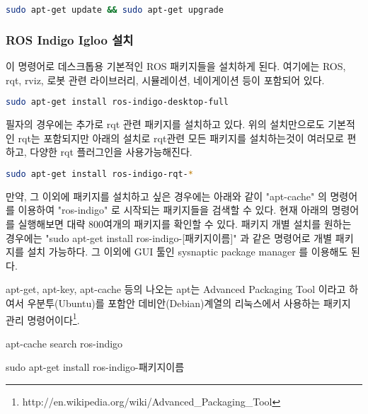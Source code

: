 \begin{lstlisting}[language=bash]
sudo apt-get update && sudo apt-get upgrade
\end{lstlisting}

\subsubsection{ROS Indigo Igloo 설치}
이 명령어로 데스크톱용 기본적인 ROS 패키지들을 설치하게 된다. 여기에는 ROS, rqt, rviz, 로봇 관련 라이브러리, 시뮬레이션, 네이게이션 등이 포함되어 있다.

\begin{lstlisting}[language=bash]
sudo apt-get install ros-indigo-desktop-full
\end{lstlisting}

필자의 경우에는 추가로 rqt 관련 패키지를 설치하고 있다. 위의 설치만으로도 기본적인 rqt는 포함되지만 아래의 설치로 rqt관련 모든 패키지를 설치하는것이 여러모로 편하고, 다양한 rqt 플러그인을 사용가능해진다.

\begin{lstlisting}[language=bash]
sudo apt-get install ros-indigo-rqt-*
\end{lstlisting}

만약, 그 이외에 패키지를 설치하고 싶은 경우에는 아래와 같이  "apt-cache" 의 명령어를 이용하여 "ros-indigo" 로 시작되는 패키지들을 검색할 수 있다. 현재 아래의 명령어를 실행해보면 대략 800여개의 패키지를 확인할 수 있다. 패키지 개별 설치를 원하는 경우에는 "sudo apt-get install ros-indigo-[패키지이름]" 과 같은 명령어로 개별 패키지를 설치 가능하다. 그 이외에 GUI 툴인 sysnaptic package manager 를 이용해도 된다.

\begin{exercise}
apt-get, apt-key, apt-cache 등의 나오는 apt는 Advanced Packaging Tool 이라고 하여서 우분투(Ubuntu)를 포함안 데비안(Debian)계열의 리눅스에서 사용하는 패키지 관리 명령어이다\footnote{http://en.wikipedia.org/wiki/Advanced\_Packaging\_Tool}.
\end{exercise}

\begin{exercise}[패키지 검색 방법]
apt-cache search ros-indigo
\end{exercise}

\begin{exercise}[패키지 개별 설치 방법]
sudo apt-get install ros-indigo-패키지이름
\end{exercise}

